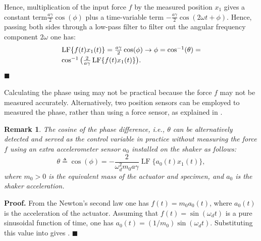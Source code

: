 \documentclass[preprint,12pt]{elsarticle}
\DeclareMathOperator{\LF}{LF}
\newtheorem{remark}{Remark}
\begin{document}
Hence, multiplication of the input force $f$ by the measured position $x_1$ gives a constant term$\frac{a\gamma}{2}\cos(\phi)$ plus a time-variable term $-\frac{a\gamma}{2}\cos(2\omega t +\phi)$. Hence, passing both sides through a low-pass filter to filter out the angular frequency component $2\omega$ one has:
\begin{equation}
\begin{array}{l}
\LF \{f(t)x_1(t) \}=\frac{a\gamma}{2}\cos(\phi)  \rightarrow  \phi =\cos^{-1} (\theta)= \vspace{0.1cm} \\ 
\cos^{-1} \big( \frac{2} {a\gamma}\LF \{f(t)x_1(t) \} \big) .
\end{array}
\label{E_multiple_avant_filter}
\end{equation}
 $\blacksquare$


 Calculating the phase using  may not be practical because the force $f$ may not be measured accurately. Alternatively, two position sensors can be employed to measured the phase, rather than using a force sensor, as explained in .
\begin{remark} \label{R_practical_phase_detection}
The cosine of the phase difference, {\em i.e.}, $\theta$ can be alternatively detected and served as the control variable in practice without measuring the force $f$ using an extra accelerometer sensor $a_0$ installed on the shaker as follows:
\begin{equation}
\theta\triangleq \cos(\phi) = -\frac{2} {\omega_d^2 m_0a\gamma}\LF \{a_0(t) x_1(t) \} ,
\label{E_phase_measured}
\end{equation}
where $m_0>0$ is the equivalent mass of the actuator and specimen, and $a_0$ is the shaker acceleration.
\end{remark} 
\noindent \textbf{Proof.}
From the Newton's second law one has $f(t)=m_0 a_0(t)$, where $a_0(t)$ is the acceleration of the actuator. Assuming that $f(t)=\sin(\omega_d t)$ is a pure sinusoidal function of time, one has $a_0(t)=(1/m_0)\sin(\omega_d t)$. Substituting this value into  gives .
$\blacksquare$
\end{document}
